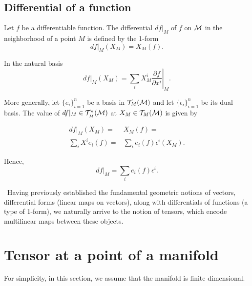 \subsection{Differential of a function}
\begin{definition}
Let $f$ be a differentiable function.
The differential $df|_{\scriptstyle M}$ of $f$ on $\mathcal{M}$ in the neighborhood of a point ${\scriptstyle M}$ is defined by the 1-form 
\begin{equation}\label{difffunc}
df|_{\scriptstyle M}(X_{\scriptstyle M})=X_{\scriptstyle M}(f).
\end{equation}
\end{definition}

In the natural basis
\[
df|_{\scriptstyle M}(X_{\scriptstyle M})= \left. \sum_i X_{\scriptstyle M}^{i}\frac{\partial f}{\partial x^{i}} \right\vert _{\scriptstyle M}.
\]

More generally, let $\{e_{i}\}_{i=1}^{n}$ be a basis in $\mathcal{T}_{\scriptstyle M}(\mathcal{M})$ and let $\{\epsilon_{i}\}_{i=1}^{n}$ be its dual basis. The value of
 $df|_{\scriptstyle M}\in \mathcal{T}^{\star}_{_{M}}(\mathcal{M})$ at $X_{\scriptstyle M}\in\mathcal{T}_{\scriptstyle M}(\mathcal{M})$ is given by 
 
 \[\begin{aligned}   
df|_{\scriptstyle M}(X_{\scriptstyle M})=&X_{\scriptstyle M}(f)=\\
\sum_i X^{i}e_{i}(f)=& \sum_i e_{i}(f)\epsilon^{i}(X_{\scriptstyle M}).
\end{aligned}\]


Hence,
\begin{equation} \label{E:difcoord}
df|_{\scriptstyle M}= \sum_i e_{i}(f)\epsilon^{i}.
\end{equation}


\,
Having previously established the fundamental geometric notions of vectors, differential forms (linear maps on vectors), along with differentials of functions (a type of 1-form), we naturally arrive to the notion of tensors, which encode multilinear maps between these objects. 


\section{Tensor at a point of a manifold}\label{S:tensor}

For simplicity, in this section, we assume that the manifold is finite dimensional.

\, 


